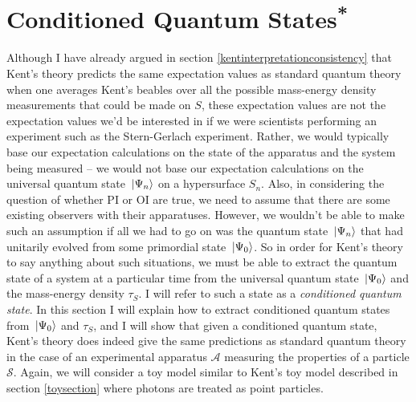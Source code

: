 
\section{Conditioned Quantum States\textsuperscript{*}}\label{KentconsistentQT}
Although I have already argued in section \ref{kentinterpretationconsistency} that Kent's theory predicts the same expectation values as standard quantum theory when one averages Kent's beables over all the possible mass-energy density measurements that could be made on $S$, these expectation values are not the expectation values we'd be interested in if we were scientists performing an experiment such as the Stern-Gerlach experiment. Rather, we would typically base our expectation calculations on the state of the apparatus and the system being measured -- we would not base our expectation calculations on the  universal quantum state $\ket*{\Psi_n}$ on a hypersurface $S_n$. Also, in considering the question of whether PI or OI are true, we need to assume that there are some existing observers with their apparatuses. However, we wouldn't be able to make such an assumption if all we had to go on was the quantum state $\ket*{\Psi_n}$ that had unitarily evolved from some primordial state $\ket*{\Psi_0}$. So in order for Kent's theory to say anything about such situations, we must be able to extract the quantum state of a system at a particular time from the universal quantum state $\ket*{\Psi_0}$ and the mass-energy density $\tau_S$. I will refer to such a state as a \emph{conditioned quantum state}. In this section I will explain how to extract conditioned quantum states from $\ket*{\Psi_0}$ and $\tau_S$, and I will show that given a conditioned quantum state, Kent's theory does indeed give the same predictions as standard quantum theory in the case of an experimental apparatus $\mathcal{A}$ measuring the properties of a particle $\mathcal{S}$. Again, we will consider a toy model similar to Kent's toy model described in section \ref{toysection} where photons are treated as point particles. 
 
